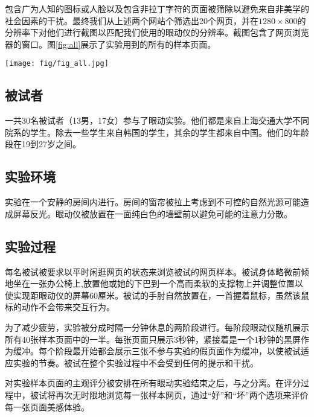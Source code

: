 

包含广为人知的图标或人脸以及包含非拉丁字符的页面被筛除以避免来自非美学的社会因素的干扰。最终我们从上述两个网站个筛选出20个网页，并在$1280\times800$的分辨率下对他们进行截图以匹配我们使用的眼动仪的分辨率。截图包含了网页浏览器的窗口。图\ref{fig:all}展示了实验用到的所有的样本页面。

\begin{figure*}
  \centering
  \texttt{[image: fig/fig\_all.jpg]}
  \caption{所有在眼动实验中被用到的图片。按照美感评分的高低从上至下，从左至右地排列}
  \label{fig:all}
\end{figure*}

\subsection{被试者}
一共30名被试者（13男，17女）参与了眼动实验。他们都是来自上海交通大学不同院系的学生。除去一些学生来自韩国的学生，其余的学生都来自中国。他们的年龄段在19到27岁之间。

\subsection{实验环境}
实验在一个安静的房间内进行。房间的窗帘被拉上考虑到不可控的自然光源可能造成屏幕反光。眼动仪被放置在一面纯白色的墙壁前以避免可能的注意力分散。

\subsection{实验过程}
每名被试被要求以平时闲逛网页的状态来浏览被试的网页样本。被试身体略微前倾地坐在一张办公椅上,放置他或她的下巴到一个高而柔软的支撑物上并调整位置以使实现距眼动仪的屏幕60厘米。被试的手肘自然放置在，一首握着鼠标，虽然该鼠标的动作不会带来交互行为。

为了减少疲劳，实验被分成时隔一分钟休息的两阶段进行。每阶段眼动仪随机展示所有40张样本页面中的一半。每张页面只展示3秒钟，紧接着是一个1秒钟的黑屏作为缓冲。每个阶段最开始都会展示三张不参与实验的假页面作为缓冲，以使被试适应实验的节奏。被试在整个实验过程中不会受到任何的提示和干扰。

对实验样本页面的主观评分被安排在所有眼动实验结束之后，与之分离。在评分过程中，被试将再次无时限地浏览每一张样本网页，通过“好”和“坏”两个选项来评价每一张页面美感体验。

